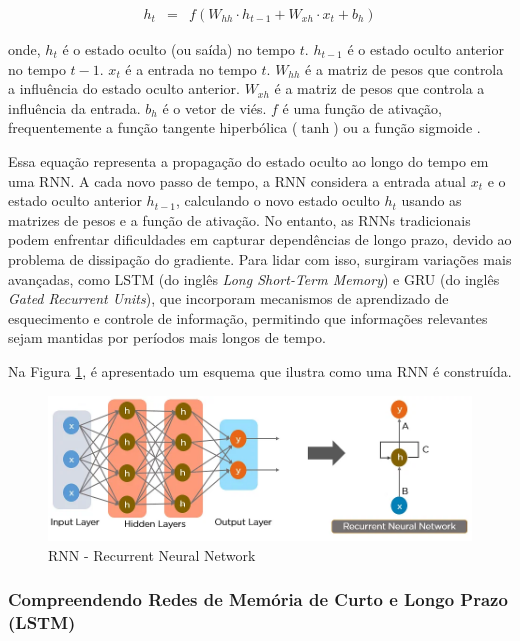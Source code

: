 \begin{eqnarray}
	h_t &=& f(W_{hh} \cdot h_{t-1} + W_{xh} \cdot x_t + b_h)
\end{eqnarray}

\noindent onde, \( h_t \) é o estado oculto (ou saída) no tempo \( t \). \( h_{t-1} \) é o estado oculto anterior no tempo \( t-1 \). \( x_t \) é a entrada no tempo \( t \). \( W_{hh} \) é a matriz de pesos que controla a influência do estado oculto anterior. \( W_{xh} \) é a matriz de pesos que controla a influência da entrada. \( b_h \) é o vetor de viés. \( f \) é uma função de ativação, frequentemente a função tangente hiperbólica ($\operatorname{tanh}$) ou a função sigmoide \cite{lstm}.


Essa equação representa a propagação do estado oculto ao longo do tempo em uma RNN. A cada novo passo de tempo, a RNN considera a entrada atual \( x_t \) e o estado oculto anterior \( h_{t-1} \), calculando o novo estado oculto \( h_t \) usando as matrizes de pesos e a função de ativação.
No entanto, as RNNs tradicionais podem enfrentar dificuldades em capturar dependências de longo prazo, devido ao problema de dissipação do gradiente. Para lidar com isso, surgiram variações mais avançadas, como LSTM (do inglês \textit{Long Short-Term Memory})  e GRU (do inglês \textit{Gated Recurrent Units}), que incorporam mecanismos de aprendizado de esquecimento e controle de informação, permitindo que informações relevantes sejam mantidas por períodos mais longos de tempo.

Na Figura \ref{fig:8s40xcsn}, é apresentado um esquema que ilustra como uma RNN é construída.

\begin{figure}[!htpb]
	\centering
	\caption{RNN - Recurrent Neural Network}
	\label{fig:8s40xcsn}
	\includegraphics[width=1\linewidth]{Apendices/Figuras/modelagem-24h/8s40xcsn}
	
\end{figure}

\subsubsection{Compreendendo Redes de Mem\'oria de Curto e Longo Prazo (LSTM)}

